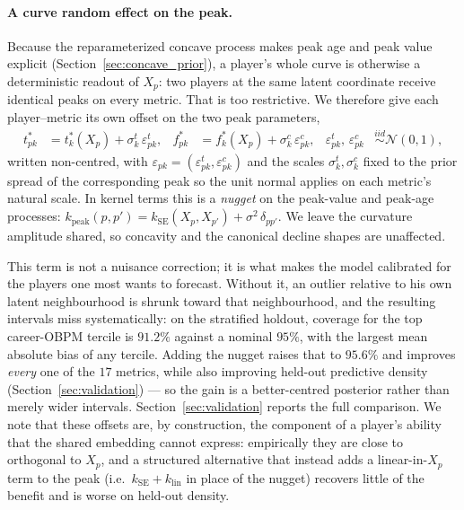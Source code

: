 \documentclass[aoas]{imsart}
\begin{document}
\paragraph{A curve random effect on the peak.}  Because the reparameterized concave process makes peak age and peak value explicit (Section~\ref{sec:concave_prior}), a player's whole curve is otherwise a deterministic readout of $X_p$: two players at the same latent coordinate receive identical peaks on every metric.  That is too restrictive.  We therefore give each player--metric its own offset on the two peak parameters,
%
\begin{align}
t^{*}_{pk} &= t^{*}_k(X_p) + \sigma^{t}_k\, \varepsilon^{t}_{pk}, &
f^{*}_{pk} &= f^{*}_k(X_p) + \sigma^{c}_k\, \varepsilon^{c}_{pk}, &
\varepsilon^{t}_{pk},\, \varepsilon^{c}_{pk} &\stackrel{iid}{\sim} \mathcal{N}(0,1),
\end{align}
%
written non-centred, with $\varepsilon_{pk} = (\varepsilon^{t}_{pk}, \varepsilon^{c}_{pk})$ and the scales $\sigma^{t}_k, \sigma^{c}_k$ fixed to the prior spread of the corresponding peak so the unit normal applies on each metric's natural scale.  In kernel terms this is a \emph{nugget} on the peak-value and peak-age processes: $k_{\text{peak}}(p,p') = k_{\mathrm{SE}}(X_p, X_{p'}) + \sigma^2\,\delta_{pp'}$.  We leave the curvature amplitude shared, so concavity and the canonical decline shapes are unaffected.

This term is not a nuisance correction; it is what makes the model calibrated for the players one most wants to forecast.  Without it, an outlier relative to his own latent neighbourhood is shrunk toward that neighbourhood, and the resulting intervals miss systematically: on the stratified holdout, coverage for the top career-OBPM tercile is $91.2\%$ against a nominal $95\%$, with the largest mean absolute bias of any tercile.  Adding the nugget raises that to $95.6\%$ and improves \emph{every} one of the $17$ metrics, while also improving held-out predictive density (Section~\ref{sec:validation}) --- so the gain is a better-centred posterior rather than merely wider intervals.  Section~\ref{sec:validation} reports the full comparison.  We note that these offsets are, by construction, the component of a player's ability that the shared embedding cannot express: empirically they are close to orthogonal to $X_p$, and a structured alternative that instead adds a linear-in-$X_p$ term to the peak (i.e.\ $k_{\mathrm{SE}} + k_{\text{lin}}$ in place of the nugget) recovers little of the benefit and is worse on held-out density.
\end{document}
